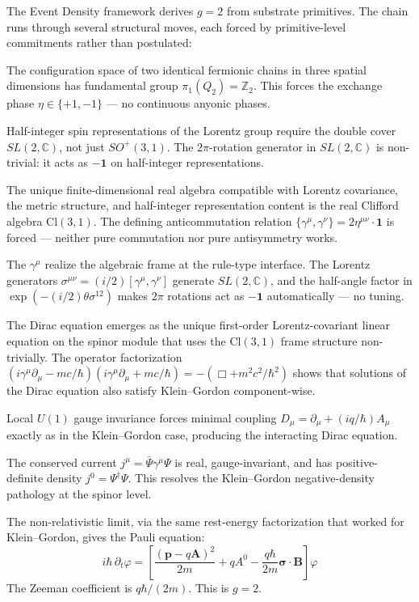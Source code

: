 \documentclass[11pt,a4paper]{article}
\begin{document}
The Event Density framework derives $g = 2$ from substrate primitives. The chain runs through several structural moves, each forced by primitive-level commitments rather than postulated:

The configuration space of two identical fermionic chains in three spatial dimensions has fundamental group $\pi_1(Q_2) = \mathbb{Z}_2$. This forces the exchange phase $\eta \in \{+1, -1\}$ --- no continuous anyonic phases.

Half-integer spin representations of the Lorentz group require the double cover $SL(2, \mathbb{C})$, not just $SO^+(3,1)$. The $2\pi$-rotation generator in $SL(2, \mathbb{C})$ is non-trivial: it acts as $-\mathbf{1}$ on half-integer representations.

The unique finite-dimensional real algebra compatible with Lorentz covariance, the metric structure, and half-integer representation content is the real Clifford algebra $\mathrm{Cl}(3,1)$. The defining anticommutation relation $\{\gamma^\mu, \gamma^\nu\} = 2\eta^{\mu\nu}\cdot\mathbf{1}$ is forced --- neither pure commutation nor pure antisymmetry works.

The $\gamma^\mu$ realize the algebraic frame at the rule-type interface. The Lorentz generators $\sigma^{\mu\nu} = (i/2)[\gamma^\mu, \gamma^\nu]$ generate $SL(2, \mathbb{C})$, and the half-angle factor in $\exp(-(i/2)\theta\sigma^{12})$ makes $2\pi$ rotations act as $-\mathbf{1}$ automatically --- no tuning.

The Dirac equation emerges as the unique first-order Lorentz-covariant linear equation on the spinor module that uses the $\mathrm{Cl}(3,1)$ frame structure non-trivially. The operator factorization $(i\gamma^\mu\partial_\mu - mc/\hbar)(i\gamma^\mu\partial_\mu + mc/\hbar) = -(\Box + m^2c^2/\hbar^2)$ shows that solutions of the Dirac equation also satisfy Klein--Gordon component-wise.

Local $U(1)$ gauge invariance forces minimal coupling $D_\mu = \partial_\mu + (iq/\hbar)A_\mu$ exactly as in the Klein--Gordon case, producing the interacting Dirac equation.

The conserved current $j^\mu = \bar\Psi\gamma^\mu\Psi$ is real, gauge-invariant, and has positive-definite density $j^0 = \Psi^\dagger\Psi$. This resolves the Klein--Gordon negative-density pathology at the spinor level.

The non-relativistic limit, via the same rest-energy factorization that worked for Klein--Gordon, gives the Pauli equation:
\[
i\hbar\, \partial_t\varphi = \left[\frac{(\mathbf{p} - q\mathbf{A})^2}{2m} + qA^0 - \frac{q\hbar}{2m}\boldsymbol{\sigma}\cdot\mathbf{B}\right]\varphi
\]
The Zeeman coefficient is $q\hbar/(2m)$. This is $g = 2$.
\end{document}

